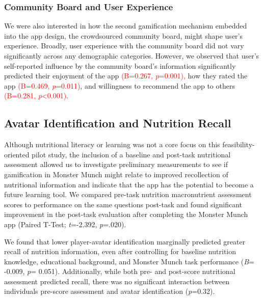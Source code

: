\subsubsection {Community Board and User Experience}
We were also interested in how the second gamification mechanism embedded into the app design, the crowdsourced community board, might shape user's experience.
Broadly, user experience with the community board did not vary significantly across any demographic categories. However, we observed that user's self-reported influence by the community board's information significantly predicted their enjoyment of the app \textcolor{red}{(B=0.267, \textit{p}=0.001),} how they rated the app \textcolor{red}{(B=0.469, \textit{p}=0.011)}, and willingness to recommend the app to others \textcolor{red}{(B=0.281, \textit{p}<0.001)}. 


\vspace{-5pt}
\subsection{Avatar Identification and  Nutrition Recall}

Although nutritional literacy or learning was not a core focus on this feasibility-oriented pilot study, the inclusion of a baseline and post-task nutritional assessment allowed us to investigate preliminary measurements to see if gamification in Monster Munch might relate to improved recollection of nutritional information and indicate that the app has the potential to become a future learning tool. We compared pre-task nutrition macronutrient assessment scores to performance on the same questions post-task and found significant improvement in the post-task evaluation after completing the Monster Munch app (Paired T-Test; \textit{t}=-2.392, \textit{p}=.020).

We found that lower player-avatar identification marginally predicted greater recall of nutrition information, even after controlling for baseline nutrition knowledge, educational background, and Monster Munch task performance (\textit{B}= -0.009, \textit{p}= 0.051). Additionally, while both pre- and post-score nutritional assessment  predicted recall, there was no significant interaction between individuals pre-score assessment and avatar identification (\textit{p}=0.32). 

